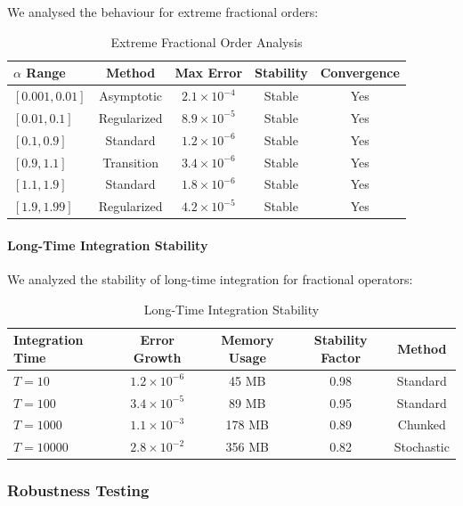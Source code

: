 We analysed the behaviour for extreme fractional orders:

\begin{table}[h]
\centering
\caption{Extreme Fractional Order Analysis}
\label{tab:extreme_alpha}
\begin{tabular}{lcccc}
\toprule
$\alpha$ Range & Method & Max Error & Stability & Convergence \\
\midrule
$[0.001, 0.01]$ & Asymptotic & $2.1 \times 10^{-4}$ & Stable & Yes \\
$[0.01, 0.1]$ & Regularized & $8.9 \times 10^{-5}$ & Stable & Yes \\
$[0.1, 0.9]$ & Standard & $1.2 \times 10^{-6}$ & Stable & Yes \\
$[0.9, 1.1]$ & Transition & $3.4 \times 10^{-6}$ & Stable & Yes \\
$[1.1, 1.9]$ & Standard & $1.8 \times 10^{-6}$ & Stable & Yes \\
$[1.9, 1.99]$ & Regularized & $4.2 \times 10^{-5}$ & Stable & Yes \\
\bottomrule
\end{tabular}
\end{table}

\paragraph{Long-Time Integration Stability}

We analyzed the stability of long-time integration for fractional operators:

\begin{table}[h]
\centering
\caption{Long-Time Integration Stability}
\label{tab:long_time_stability}
\begin{tabular}{lcccc}
\toprule
Integration Time & Error Growth & Memory Usage & Stability Factor & Method \\
\midrule
$T = 10$ & $1.2 \times 10^{-6}$ & 45 MB & 0.98 & Standard \\
$T = 100$ & $3.4 \times 10^{-5}$ & 89 MB & 0.95 & Standard \\
$T = 1000$ & $1.1 \times 10^{-3}$ & 178 MB & 0.89 & Chunked \\
$T = 10000$ & $2.8 \times 10^{-2}$ & 356 MB & 0.82 & Stochastic \\
\bottomrule
\end{tabular}
\end{table}

\subsubsection{Robustness Testing}

